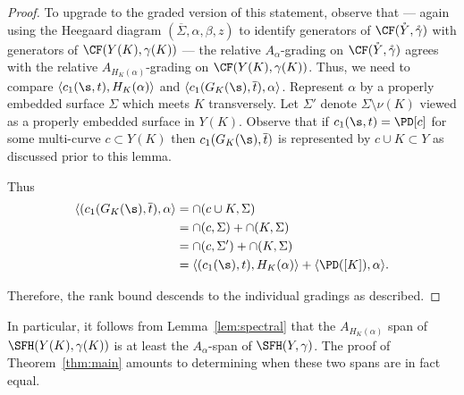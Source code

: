 \documentclass{amsart}
\theoremstyle{definition}
\theoremstyle{remark}
\numberwithin{equation}{section}
\begin{document}
\begin{proof}
      To upgrade to the graded version of this statement, observe that --- again using the Heegaard diagram $(\overline{\Sigma},\alpha,\beta,z)$ to identify generators of  $\CF(\mathring{Y},\mathring{\gamma})$ with generators of  $\CF({Y}(K),\gamma(K))$ --- the relative $A_{\alpha}$-grading on $\CF(\mathring{Y},\mathring{\gamma})$ agrees with the relative $A_{H_K(\alpha)}$-grading on $\CF({Y}(K),\gamma(K))$. Thus, we need to compare $\langle c_1(\s,t),H_K(\alpha)\rangle$ and $\langle c_1(G_K(\s),\overline{t}),\alpha\rangle$. Represent $\alpha$ by a properly embedded surface $\Sigma$ which meets $K$ transversely. Let $\Sigma'$ denote $\Sigma\setminus \nu(K)$ viewed as a properly embedded surface in  $Y(K)$. Observe that if $c_1(\s,t)=\PD[c]$ for some multi-curve $c\subset Y(K)$ then $c_1(G_K(\s),\overline{t})$ is represented by $c\cup K\subset Y$ as discussed prior to this lemma.
    
    Thus 
    \begin{align*}
        \langle( c_1(G_K(\s),\overline{t}),\alpha\rangle&=\cap(c\cup K,\Sigma)\\&=\cap(c,\Sigma)+\cap(K,\Sigma)\\&=\cap(c,\Sigma')+\cap(K,\Sigma)\\&=\langle (c_1(\s),t),H_K(\alpha)\rangle+ \langle \PD([K]),\alpha\rangle.
    \end{align*}

  Therefore, the rank bound descends to the individual gradings as described.\end{proof}




In particular, it follows from Lemma~\ref{lem:spectral} that the $A_{H_K(\alpha)}$ span of $\SFH(Y(K),\gamma(K))$ is at least the $A_{\alpha}$-span of $\SFH(Y,\gamma)$. The proof of Theorem~\ref{thm:main} amounts to determining when these two spans are in fact equal.
\end{document}
